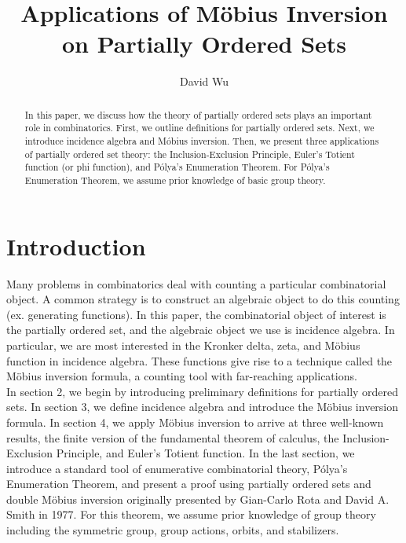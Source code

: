 \documentclass[psamsfonts]{amsart}
\title{Applications of M\"{o}bius Inversion on Partially Ordered Sets}
\author{David Wu}
\theoremstyle{definition}
\theoremstyle{remark}
\numberwithin{equation}{section}
\begin{document}
\begin{abstract}
In this paper, we discuss how the theory of partially ordered sets plays an important role in  combinatorics. First, we outline definitions for partially ordered sets. Next, we introduce incidence algebra and M\'{o}bius inversion. Then, we present three applications of partially ordered set theory: the Inclusion-Exclusion Principle, Euler's Totient function (or phi function), and P\'{o}lya's Enumeration Theorem. For  P\'{o}lya's Enumeration Theorem, we assume prior knowledge of basic group theory.
\end{abstract}
\maketitle

\tableofcontents

\section{Introduction}
\indent Many problems in combinatorics deal with counting a particular combinatorial object. A common strategy is to construct an algebraic object to do this counting (ex. generating functions). In this paper, the combinatorial object of interest is the partially ordered set, and the algebraic object we use is incidence algebra. In particular, we are most interested in the Kronker delta, zeta, and M\"{o}bius function in incidence algebra. These functions give rise to a technique called the M\"{o}bius inversion formula, a counting tool with far-reaching applications. \\
\indent In section 2, we begin by introducing preliminary definitions for partially ordered sets. In section 3, we define incidence algebra and introduce the M\"{o}bius inversion formula. In section 4, we apply M\"{o}bius inversion to arrive at three well-known results, the finite version of the fundamental theorem of calculus, the Inclusion-Exclusion Principle, and Euler's Totient function. In the last section, we introduce a standard tool of enumerative combinatorial theory, P\'{o}lya's Enumeration Theorem, and present a proof using partially ordered sets and double M\"{o}bius inversion originally presented by Gian-Carlo Rota and David A. Smith in 1977\cite{Polya}. For this theorem, we assume prior knowledge of group theory including the symmetric group, group actions, orbits, and stabilizers.
\end{document}
